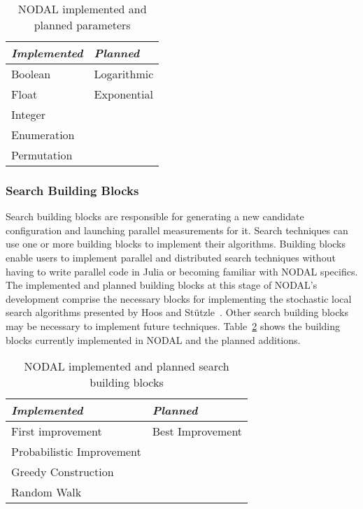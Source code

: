 \begin{table}[htpb]
\centering
\begin{tabular}{@{}p{}p{}@{}}
\toprule
\textit{Implemented} & \textit{Planned} \\ \midrule
Boolean & Logarithmic \\
Float & Exponential \\
Integer & \\
Enumeration & \\
Permutation & \\ \bottomrule
\end{tabular}
\caption{NODAL implemented and planned parameters}
\label{tab:nodal-parameters}
\end{table}

\subsubsection{Search Building Blocks}

Search building blocks are responsible for generating a new candidate
configuration and launching parallel measurements for it. Search techniques can
use one or more building blocks to implement their algorithms. Building blocks
enable users to implement parallel and distributed search techniques without
having to write parallel code in Julia or becoming familiar with NODAL
specifics. The implemented and planned building blocks at this stage of NODAL's
development comprise the necessary blocks for implementing the stochastic local
search algorithms presented by Hoos and Stützle~\cite{hoos2015stochastic}.
Other search building blocks may be necessary to implement future techniques.
Table~\ref{tab:nodal-blocks} shows the building blocks currently implemented in
NODAL and the planned additions.

\begin{table}[htpb]
\centering
\begin{tabular}{@{}p{}p{}@{}}
\toprule
\textit{Implemented} & \textit{Planned} \\ \midrule
First improvement & Best Improvement \\
Probabilistic Improvement & \\
Greedy Construction & \\
Random Walk & \\ \bottomrule
\end{tabular}
\caption{NODAL implemented and planned search building blocks}
\label{tab:nodal-blocks}
\end{table}

